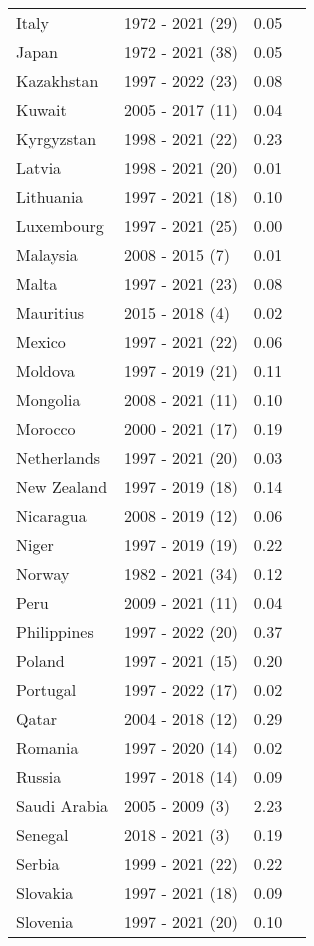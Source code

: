 \begin{table}[H]
{{\centering
\begin{tabular}{llrr}
Italy & 1972 - 2021 (29) & 0.05\\
Japan & 1972 - 2021 (38) & 0.05\\
Kazakhstan & 1997 - 2022 (23) & 0.08\\
Kuwait & 2005 - 2017 (11) & 0.04\\
Kyrgyzstan & 1998 - 2021 (22) & 0.23\\
\addlinespace
Latvia & 1998 - 2021 (20) & 0.01\\
Lithuania & 1997 - 2021 (18) & 0.10\\
Luxembourg & 1997 - 2021 (25) & 0.00\\
Malaysia & 2008 - 2015 (7) & 0.01\\
Malta & 1997 - 2021 (23) & 0.08\\
\addlinespace
Mauritius & 2015 - 2018 (4) & 0.02\\
Mexico & 1997 - 2021 (22) & 0.06\\
Moldova & 1997 - 2019 (21) & 0.11\\
Mongolia & 2008 - 2021 (11) & 0.10\\
Morocco & 2000 - 2021 (17) & 0.19\\
\addlinespace
Netherlands & 1997 - 2021 (20) & 0.03\\
New Zealand & 1997 - 2019 (18) & 0.14\\
Nicaragua & 2008 - 2019 (12) & 0.06\\
Niger & 1997 - 2019 (19) & 0.22\\
Norway & 1982 - 2021 (34) & 0.12\\
\addlinespace
Peru & 2009 - 2021 (11) & 0.04\\
Philippines & 1997 - 2022 (20) & 0.37\\
Poland & 1997 - 2021 (15) & 0.20\\
Portugal & 1997 - 2022 (17) & 0.02\\
Qatar & 2004 - 2018 (12) & 0.29\\
\addlinespace
Romania & 1997 - 2020 (14) & 0.02\\
Russia & 1997 - 2018 (14) & 0.09\\
Saudi Arabia & 2005 - 2009 (3) & 2.23\\
Senegal & 2018 - 2021 (3) & 0.19\\
Serbia & 1999 - 2021 (22) & 0.22\\
\addlinespace
Slovakia & 1997 - 2021 (18) & 0.09\\
Slovenia & 1997 - 2021 (20) & 0.10\\

\end{tabular}}}
\end{table}
